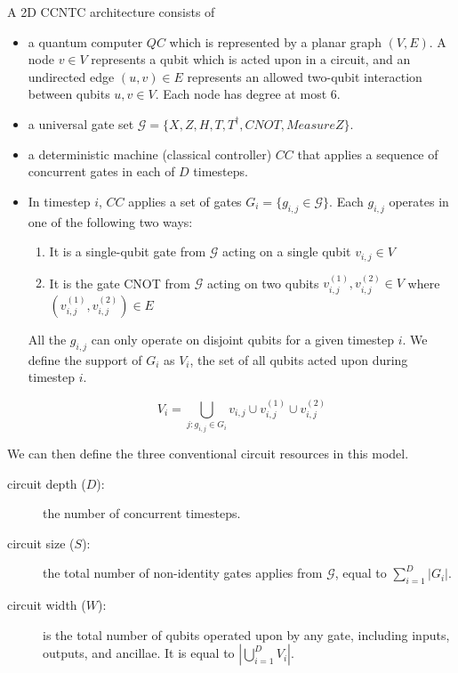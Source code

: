 \begin{definition}
A 2D CCNTC architecture consists of

\begin{itemize}
\item a quantum computer $QC$ which is represented by a planar graph $(V,E)$. A
node $v \in V$ represents a qubit which is acted upon in a circuit, and an
undirected edge $(u,v) \in E$ represents 
an allowed two-qubit interaction between qubits $u,v \in V$. Each node has
degree at most $6$.
\item a universal gate set $\mathcal{G} = \{X, Z, H, T, T^{\dagger}, CNOT, MeasureZ\}$.

\item a deterministic machine (classical controller) $CC$ that applies a sequence
of concurrent gates in each of $D$ timesteps.
\item In timestep $i$, $CC$ applies a set of
gates $G_i = \{g_{i,j} \in \mathcal{G} \}$.
Each $g_{i,j}$ operates in one of the following two ways:
\begin{enumerate}
\item It is a single-qubit gate from $\mathcal{G}$ acting on a single qubit $v_{i,j} \in V$
\item
It is the gate CNOT from $\mathcal{G}$ acting on two qubits $v^{(1)}_{i,j}, v^{(2)}_{i,j} \in V$ where
$(v^{(1)}_{i,j}, v^{(2)}_{i,j}) \in E$
\end{enumerate}
All the $g_{i,j}$ can only operate on
disjoint qubits for a given timestep $i$. We define the support of $G_i$
as $V_i$, the set of all qubits acted upon during timestep $i$.

\begin{equation}
V_i = \bigcup_{j: g_{i,j} \in G_i} v_{i,j} \cup v^{(1)}_{i,j} \cup v^{(2)}_{i,j}
\end{equation}

\end{itemize}
\end{definition}

We can then define the three conventional circuit resources in this model.

\begin{description}
\item[circuit depth ($D$):] the number of concurrent timesteps.
\item[circuit size ($S$):] the total number of non-identity gates applies
from $\mathcal{G}$, equal to $\sum_{i=1}^D |G_i|$.
\item[circuit width ($W$):] is the total number of qubits operated upon by
any gate, including inputs, outputs, and ancillae. It is equal to $| \bigcup_{i=1}^D V_i|$.
\end{description}

